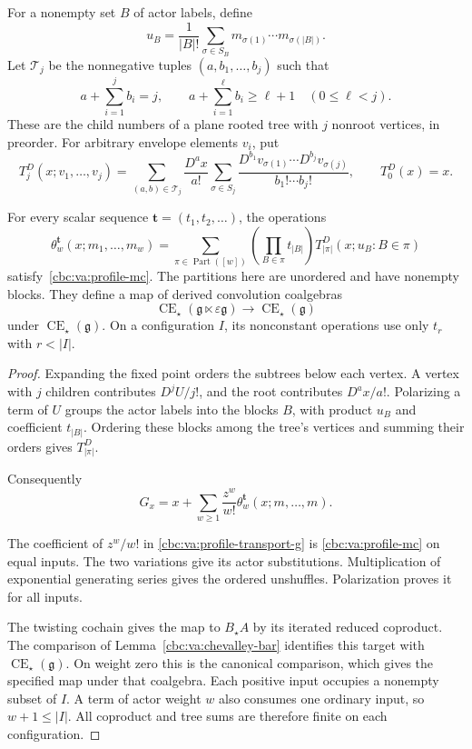 For a nonempty set $B$ of actor labels, define
\[
 u_B=\frac1{|B|!}\sum_{\sigma\in S_B}
                 m_{\sigma(1)}\cdots m_{\sigma(|B|)}.
\]
Let $\mathcal T_j$ be the nonnegative tuples
$(a,b_1,\ldots,b_j)$ such that
\[
 a+\sum_{i=1}^jb_i=j,\qquad
 a+\sum_{i=1}^\ell b_i\geq\ell+1
                    \quad(0\leq\ell<j).
\]
These are the child numbers of a plane rooted tree
with $j$ nonroot vertices, in preorder.
For arbitrary envelope elements $v_i$, put
\[
 T_j^D(x;v_1,\ldots,v_j)=
 \sum_{(a,b)\in\mathcal T_j}\frac{D^ax}{a!}
 \sum_{\sigma\in S_j}
 \frac{D^{b_1}v_{\sigma(1)}\cdots D^{b_j}v_{\sigma(j)}}
      {b_1!\cdots b_j!},
 \qquad T_0^D(x)=x.
\]

\begin{theorem}\label{cbc:va:profiles-theorem}
For every scalar sequence $\mathbf t=(t_1,t_2,\ldots)$,
the operations
\begin{equation}\label{cbc:va:profile-partitions}
 \theta_w^{\mathbf t}(x;m_1,\ldots,m_w)
 =\sum_{\pi\in\operatorname{Part}([w])}
     \left(\prod_{B\in\pi}t_{|B|}\right)
     T_{|\pi|}^D(x;u_B:B\in\pi)
\end{equation}
satisfy~\eqref{cbc:va:profile-mc}. The partitions here
are unordered and have nonempty blocks.
They define a map of derived convolution coalgebras
\[
 \operatorname{CE}_\star
          (\mathfrak g\ltimes\varepsilon\mathfrak g)
 \longrightarrow\operatorname{CE}_\star(\mathfrak g)
\]
under $\operatorname{CE}_\star(\mathfrak g)$.
On a configuration $I$, its nonconstant operations
use only $t_r$ with $r<|I|$.
\end{theorem}
\begin{proof}
Expanding the fixed point orders the subtrees below
each vertex. A vertex with $j$ children contributes
$D^jU/j!$, and the root contributes $D^ax/a!$.
Polarizing a term of $U$ groups the actor labels into
the blocks $B$, with product $u_B$ and coefficient
$t_{|B|}$. Ordering these blocks among the tree's
vertices and summing their orders gives $T_{|\pi|}^D$.

Consequently
\[
 G_x=x+\sum_{w\geq1}\frac{z^w}{w!}
              \theta_w^{\mathbf t}(x;m,\ldots,m).
\]

The coefficient of $z^w/w!$ in
\eqref{cbc:va:profile-transport-g} is
\eqref{cbc:va:profile-mc} on equal inputs.
The two variations give its actor substitutions.
Multiplication of exponential generating series
gives the ordered unshuffles. Polarization proves it for
all inputs.

The twisting cochain gives the map to $B_\star A$
by its iterated reduced coproduct. The
comparison of Lemma~\ref{cbc:va:chevalley-bar} identifies this target
with $\operatorname{CE}_\star(\mathfrak g)$.
On weight zero this is the canonical comparison,
which gives the specified map under that coalgebra.
Each positive input occupies a nonempty subset of
$I$. A term of actor weight $w$ also consumes one
ordinary input, so $w+1\leq|I|$. All coproduct and
tree sums are therefore finite on each configuration.
\end{proof}

